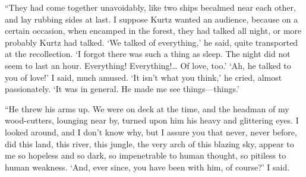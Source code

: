 \documentclass[12pt]{report}
\begin{document}
``They had come together unavoidably, like two ships becalmed near each
other, and lay rubbing sides at last. I suppose Kurtz wanted an
audience, because on a certain occasion, when encamped in the forest,
they had talked all night, or more probably Kurtz had talked. `We talked
of everything,' he said, quite transported at the recollection. `I
forgot there was such a thing as sleep. The night did not seem to last
an hour. Everything! Everything!\ldots{} Of love, too.' `Ah, he talked
to you of love!' I said, much amused. `It isn't what you think,' he
cried, almost passionately. `It was in general. He made me see
things---things.'

``He threw his arms up. We were on deck at the time, and the headman of
my wood-cutters, lounging near by, turned upon him his heavy and
glittering eyes. I looked around, and I don't know why, but I assure you
that never, never before, did this land, this river, this jungle, the
very arch of this blazing sky, appear to me so hopeless and so dark, so
impenetrable to human thought, so pitiless to human weakness. `And, ever
since, you have been with him, of course?' I said.
\end{document}
